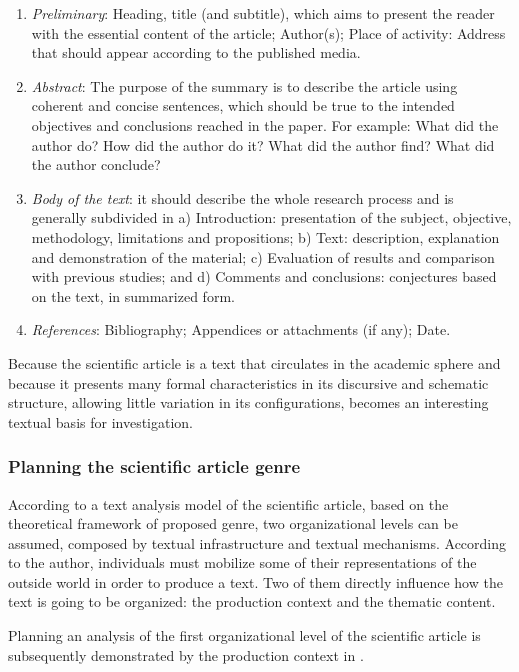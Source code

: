 \documentclass[english]{textolivre}
\begin{document}
\begin{enumerate}
    \item \textit{Preliminary}: Heading, title (and subtitle), which aims to present the reader with the essential content of the article; Author(s); Place of activity: Address that should appear according to the published media.
    \item \textit{Abstract}: The purpose of the summary is to describe the article using coherent and concise sentences, which should be true to the intended objectives and conclusions reached in the paper. For example: What did the author do? How did the author do it? What did the author find? What did the author conclude?
    \item \textit{Body of the text}: it should describe the whole research process and is generally subdivided in a) Introduction: presentation of the subject, objective, methodology, limitations and propositions; b) Text: description, explanation and demonstration of the material; c) Evaluation of results and comparison with previous studies; and d) Comments and conclusions: conjectures based on the text, in summarized form.
    \item \textit{References}: Bibliography; Appendices or attachments (if any); Date.
\end{enumerate}

Because the scientific article is a text that circulates in the academic sphere and because it presents many formal characteristics in its discursive and schematic structure, allowing little variation in its configurations, becomes an interesting textual basis for investigation.

\subsubsection{Planning the scientific article genre}\label{sec-organizacao}
According to a text analysis model of the scientific article, based on the theoretical framework of \textcite{bronckart_atividade_1999} proposed genre, two organizational levels can be assumed, composed by textual infrastructure and textual mechanisms. According to the author, individuals must mobilize some of their representations of the outside world in order to produce a text. Two of them directly influence how the text is going to be organized: the production context and the thematic content.

Planning an analysis of the first organizational level of the scientific article is subsequently demonstrated by the production context in .
\end{document}
